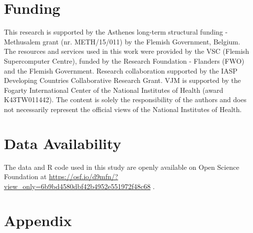 \documentclass{article}
\begin{document}
\section{Funding} 

This research is supported by the Asthenes long-term structural funding - Methusalem grant (nr. METH/15/011) by the Flemish Government, Belgium. The resources and services used in this work were provided by the VSC (Flemish Supercomputer Centre), funded by the Research Foundation - Flanders (FWO) and the Flemish Government. Research collaboration supported by the IASP Developing Countries Collaborative Research Grant. VJM is supported by the Fogarty International Center of the National Institutes of Health (award K43TW011442). The content is solely the responsibility of the authors and does not necessarily represent the official views of the National Institutes of Health.

\section{Data Availability} 

The data and R code used in this study are openly available on Open Science Foundation at \href{https://osf.io/d9mfn/?view\_only=6b9bd4580dbf42b4952e551972f48c68}{https://osf.io/d9mfn/?view\_only=6b9bd4580dbf42b4952e551972f48c68} . 

\section{Appendix} 
\end{document}
